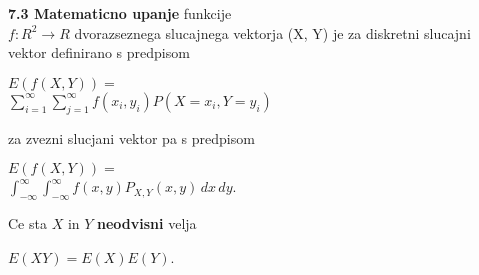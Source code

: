 \documentclass{article}
\begin{document}
\begin{multicols}{2}
	\textbf{7.3 Matematicno upanje} funkcije\\
	$f: R^2 \rightarrow R$ dvorazseznega slucajnega vektorja (X, Y) je
	za diskretni slucajni vektor definirano s predpisom
	\begin{center}
		\begin{math}
			E(f(X,Y)) =
		\end{math}\\
		\begin{math}
			\sum_{i=1}^{\infty}\sum_{j=1}^{\infty} f(x_i, y_i) P(X = x_i, Y = y_i)
		\end{math}
	\end{center}
	za zvezni slucjani vektor pa s predpisom
	\begin{center}
		\begin{math}
			E(f(X,Y)) =
		\end{math}\\
		\begin{math}
			\int_{-\infty}^{\infty}\int_{-\infty}^{\infty} f(x, y) P_{X,Y}(x,y)\,dx\,dy
		\end{math}.
	\end{center}
	Ce sta $X$ in $Y$ \textbf{neodvisni} velja
	\begin{center}
		\begin{math}
			E(XY) = E(X)E(Y)
		\end{math}.
	\end{center}


\end{multicols}
\end{document}
